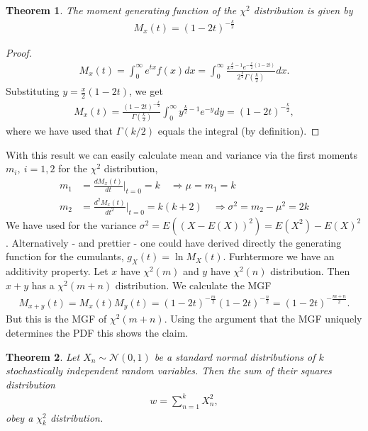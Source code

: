 \documentclass[10pt,a4paper]{article}
\newtheorem{theorem}{Theorem}
\begin{document}
\begin{theorem} \label{thm_moment_generating_chi_squared}
The moment generating function  of the $\chi^2$ distribution is given by 
\begin{align*}
M_x(t)=(1-2t)^{-\frac{k}{2}}
\end{align*}
\end{theorem}
\begin{proof}
\begin{align*}
M_x(t)=\int_0^\infty e^{tx} f(x)dx = \int_0^\infty  \frac{x^{\frac{k}{2}-1} e^{-\frac{x}{2}(1-2t)}}{2^{\frac{k}{2}}\Gamma(\frac{k}{2})} dx.
\end{align*}
Substituting $y = \frac{x}{2}(1-2t)$, we get
\begin{align*}
M_x(t)= \frac{(1-2t)^{-\frac{k}{2}}}{\Gamma(\frac{k}{2})}\int_0^\infty y^{\frac{k}{2}-1} e^{-y} dy = (1-2t)^{-\frac{k}{2}},
\end{align*}
where we have used that $\Gamma(k/2)$ equals the integral (by definition).
\end{proof}
With this result we can easily calculate mean and variance via the first moments $m_i,~ i=1,2$ for the $\chi^2$ distribution,
\begin{align}
m_1 &= \frac{d M_x(t) }{dt} \bigg \rvert_{t=0} = k  \quad \Rightarrow \mu = m_1 = k\\
m_2 &= \frac{d^2 M_x(t) }{dt^2} \bigg \rvert_{t=0} = k(k+2) \quad
\Rightarrow \sigma^2 = m_2 - \mu^2 = 2k 
\end{align}
We have used for the variance $\sigma^2 = E((X-E(X))^2) =  E(X^2) - E(X)^2$. Alternatively - and prettier - one could have derived directly the generating function for the cumulants, $g_X(t) = \ln M_X(t)$.
Furhtermore we have an additivity property. Let $x$ have $\chi^2(m)$ and $y$ have $\chi^2(n)$ distribution. Then $x+y$ has a $\chi^2(m+n)$ distribution. We calculate the MGF
\begin{align}
M_{x+y}(t) = M_x(t)M_y(t) = (1-2t)^{-\frac{m}{2}} (1-2t)^{-\frac{n}{2}} = (1-2t)^{-\frac{m+n}{2}}.
\end{align}
But this is the MGF of $\chi^2(m+n)$. Using the argument that the MGF uniquely determines the PDF this shows the claim.
\begin{theorem}
Let $X_n \sim \mathcal{N}(0,1)$ be a standard normal distributions of $k$ stochastically independent random variables. Then the sum of their squares distribution
\begin{align*}
 w = \sum _{n=1}^k X_n^2, 
\end{align*}
 obey a $\chi^2_k$ distribution.
\end{theorem}
\end{document}
